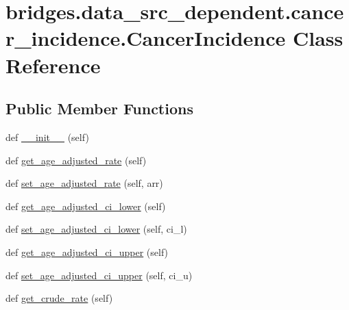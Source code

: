 \hypertarget{classbridges_1_1data__src__dependent_1_1cancer__incidence_1_1_cancer_incidence}{}\section{bridges.\+data\+\_\+src\+\_\+dependent.\+cancer\+\_\+incidence.\+Cancer\+Incidence Class Reference}
\label{classbridges_1_1data__src__dependent_1_1cancer__incidence_1_1_cancer_incidence}
\subsection*{Public Member Functions}
\begin{DoxyCompactItemize}
\item 
def \mbox{\hyperlink{classbridges_1_1data__src__dependent_1_1cancer__incidence_1_1_cancer_incidence_a14ca87e4a6a0c2f394c46f0980ac922c}{\+\_\+\+\_\+init\+\_\+\+\_\+}} (self)
\item 
def \mbox{\hyperlink{classbridges_1_1data__src__dependent_1_1cancer__incidence_1_1_cancer_incidence_a8f679189f9811d6f5c43503f95d87666}{get\+\_\+age\+\_\+adjusted\+\_\+rate}} (self)
\item 
def \mbox{\hyperlink{classbridges_1_1data__src__dependent_1_1cancer__incidence_1_1_cancer_incidence_a437897ce848c5deec32b7c8eafc1ff68}{set\+\_\+age\+\_\+adjusted\+\_\+rate}} (self, arr)
\item 
def \mbox{\hyperlink{classbridges_1_1data__src__dependent_1_1cancer__incidence_1_1_cancer_incidence_ae567ee5ec0334912272652eaed74f838}{get\+\_\+age\+\_\+adjusted\+\_\+ci\+\_\+lower}} (self)
\item 
def \mbox{\hyperlink{classbridges_1_1data__src__dependent_1_1cancer__incidence_1_1_cancer_incidence_a846cee6b8db4c47c6f08aca463886351}{set\+\_\+age\+\_\+adjusted\+\_\+ci\+\_\+lower}} (self, ci\+\_\+l)
\item 
def \mbox{\hyperlink{classbridges_1_1data__src__dependent_1_1cancer__incidence_1_1_cancer_incidence_a0530a49e935e90b6ca0fe1c1d31f937b}{get\+\_\+age\+\_\+adjusted\+\_\+ci\+\_\+upper}} (self)
\item 
def \mbox{\hyperlink{classbridges_1_1data__src__dependent_1_1cancer__incidence_1_1_cancer_incidence_abed4a78c4e51559d19c1c5dfaadb2bc8}{set\+\_\+age\+\_\+adjusted\+\_\+ci\+\_\+upper}} (self, ci\+\_\+u)
\item 
def \mbox{\hyperlink{classbridges_1_1data__src__dependent_1_1cancer__incidence_1_1_cancer_incidence_a8ba4f50886eaeac0c7f40c3de1555ba5}{get\+\_\+crude\+\_\+rate}} (self)

\end{DoxyCompactItemize}
